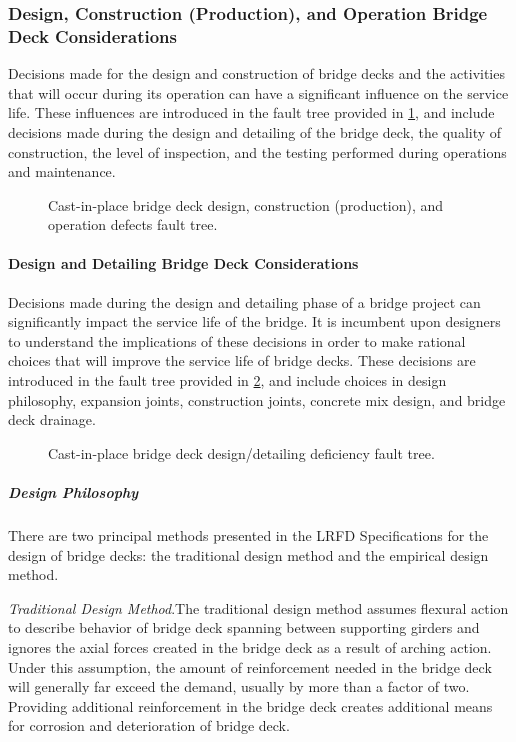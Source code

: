 \subsubsection{Design, Construction (Production), and Operation Bridge Deck Considerations}
Decisions made for the design and construction of bridge decks and the activities that will occur during its
operation can have a significant influence on the service life. These influences are introduced in the fault tree
provided in \cref{fig:fault-tree-cip-deck-operation}, and include decisions made during the design and detailing of the bridge deck, the quality of
construction, the level of inspection, and the testing performed during operations and maintenance.

\begin{figure}
  \caption{Cast-in-place bridge deck design, construction (production), and operation defects fault tree.}
  \label{fig:fault-tree-cip-deck-operation}
\end{figure}

\paragraph{Design and Detailing Bridge Deck Considerations}
Decisions made during the design and detailing phase of a bridge project can significantly impact the service life
of the bridge. It is incumbent upon designers to understand the implications of these decisions in order to make
rational choices that will improve the service life of bridge decks. These decisions are introduced in the fault tree
provided in \cref{fig:fault-tree-cip-deck-design}, and include choices in design philosophy, expansion joints, construction joints, concrete mix
design, and bridge deck drainage.

\begin{figure}
  \caption{Cast-in-place bridge deck design/detailing deficiency fault tree.}
  \label{fig:fault-tree-cip-deck-design}
\end{figure}

\subparagraph{Design Philosophy}
There are two principal methods presented in the LRFD Specifications for the design of bridge decks: the
traditional design method and the empirical design method.

\emph{Traditional Design Method}.The traditional design method assumes flexural action to describe behavior of bridge
deck spanning between supporting girders and ignores the axial forces created in the bridge deck as a result of arching action. Under this assumption, the amount of reinforcement needed in the bridge deck will generally far
exceed the demand, usually by more than a factor of two. Providing additional reinforcement in the bridge deck
creates additional means for corrosion and deterioration of bridge deck.

